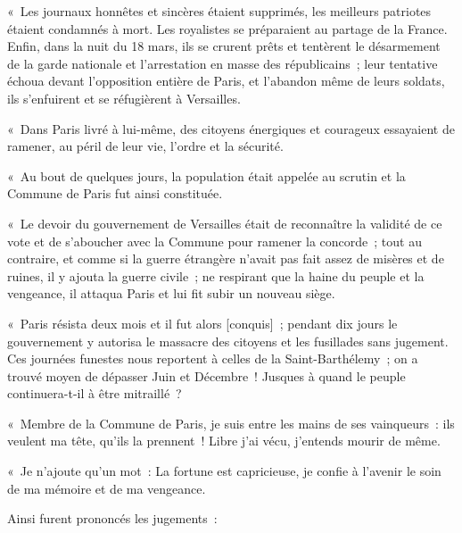 \documentclass[french,twoside]{book} %
\newcommand\corr[1]{#1}
\newcommand{\signed}[1]{\bigbreak\filbreak{\raggedleft #1\par}\medskip}
\newenvironment{quoteblock}%
  {\begin{quoting}}
  {\end{quoting}}
\newenvironment{quotebar}{%
    \def\FrameCommand{{\color{rubric!10!}\vrule width 0.5em} \hspace{0.9em}}%
    \def\OuterFrameSep{\itemsep} %
    \MakeFramed {\advance\hsize-\width \FrameRestore}
  }%
  {%
    \endMakeFramed
  }
\renewenvironment{quoteblock}%
  {%
    \savenotes
    \setstretch{0.9}
    \normalfont
    \begin{quotebar}
  }
  {%
    \end{quotebar}
    \spewnotes
  }
\begin{document}
\begin{quoteblock}
 \noindent « Les journaux honnêtes et sincères étaient supprimés, les meilleurs patriotes étaient condamnés à mort. Les royalistes se préparaient au partage de la France. Enfin, dans la nuit du 18 mars, ils se crurent prêts et tentèrent le désarmement de la garde nationale et l’arrestation en masse des républicains ; leur tentative échoua devant l’opposition entière de Paris, et l’abandon même de leurs soldats, ils s’enfuirent et se réfugièrent à Versailles.\par
 « Dans Paris livré à lui-même, des citoyens énergiques et courageux essayaient de ramener, au péril de leur vie, l’ordre et la sécurité.\par
 « Au bout de quelques jours, la population était appelée au scrutin et la Commune de Paris fut ainsi constituée.\par
 « Le devoir du gouvernement de Versailles était de reconnaître la validité de ce vote et de s’aboucher avec la Commune pour ramener la  concorde ; tout au contraire, et comme si la guerre étrangère n’avait pas fait assez de misères et de ruines, il y ajouta la guerre civile ; ne respirant que la haine du peuple et la vengeance, il attaqua Paris et lui fit subir un nouveau siège.\par
 « Paris résista deux mois et il fut alors [{\corr conquis}] ; pendant dix jours le gouvernement y autorisa le massacre des citoyens et les fusillades sans jugement. Ces journées funestes nous reportent à celles de la Saint-Barthélemy ; on a trouvé moyen de dépasser Juin et Décembre ! Jusques à quand le peuple continuera-t-il à être mitraillé ?\par
 « Membre de la Commune de Paris, je suis entre les mains de ses vainqueurs : ils veulent ma tête, qu’ils la prennent ! Libre j’ai vécu, j’entends mourir de même.\par
 « Je n’ajoute qu’un mot : La fortune est capricieuse, je confie à l’avenir le soin de ma mémoire et de ma vengeance.\par
 

\signed{« T{\scshape h}. F{\scshape erré}. »}
 \end{quoteblock}

\noindent Ainsi furent prononcés les jugements :\par
 
\end{document}
